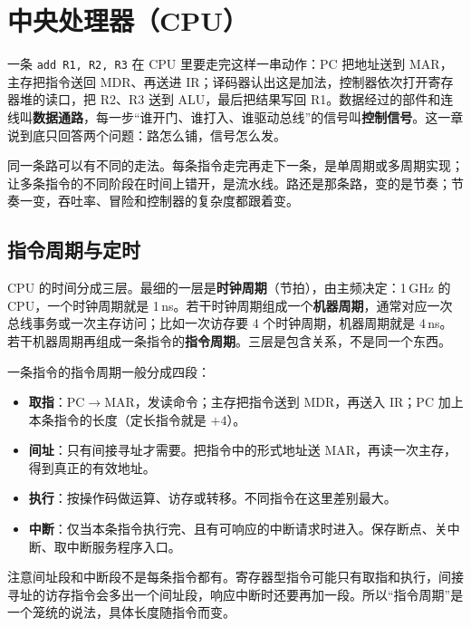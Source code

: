 \section{中央处理器（CPU）}

一条 \texttt{add R1, R2, R3} 在 CPU 里要走完这样一串动作：PC 把地址送到 MAR，主存把指令送回 MDR、再送进 IR；译码器认出这是加法，控制器依次打开寄存器堆的读口，把 R2、R3 送到 ALU，最后把结果写回 R1。数据经过的部件和连线叫\textbf{数据通路}，每一步“谁开门、谁打入、谁驱动总线”的信号叫\textbf{控制信号}。这一章说到底只回答两个问题：路怎么铺，信号怎么发。

同一条路可以有不同的走法。每条指令走完再走下一条，是单周期或多周期实现；让多条指令的不同阶段在时间上错开，是流水线。路还是那条路，变的是节奏；节奏一变，吞吐率、冒险和控制器的复杂度都跟着变。

\subsection{指令周期与定时}

CPU 的时间分成三层。最细的一层是\textbf{时钟周期}（节拍），由主频决定：1\,GHz 的 CPU，一个时钟周期就是 1\,ns。若干时钟周期组成一个\textbf{机器周期}，通常对应一次总线事务或一次主存访问；比如一次访存要 4 个时钟周期，机器周期就是 4\,ns。若干机器周期再组成一条指令的\textbf{指令周期}。三层是包含关系，不是同一个东西。

一条指令的指令周期一般分成四段：

\begin{itemize}
  \item \textbf{取指}：PC$\to$MAR，发读命令；主存把指令送到 MDR，再送入 IR；PC 加上本条指令的长度（定长指令就是 $+4$）。
  \item \textbf{间址}：只有间接寻址才需要。把指令中的形式地址送 MAR，再读一次主存，得到真正的有效地址。
  \item \textbf{执行}：按操作码做运算、访存或转移。不同指令在这里差别最大。
  \item \textbf{中断}：仅当本条指令执行完、且有可响应的中断请求时进入。保存断点、关中断、取中断服务程序入口。
\end{itemize}

注意间址段和中断段不是每条指令都有。寄存器型指令可能只有取指和执行，间接寻址的访存指令会多出一个间址段，响应中断时还要再加一段。所以“指令周期”是一个笼统的说法，具体长度随指令而变。

